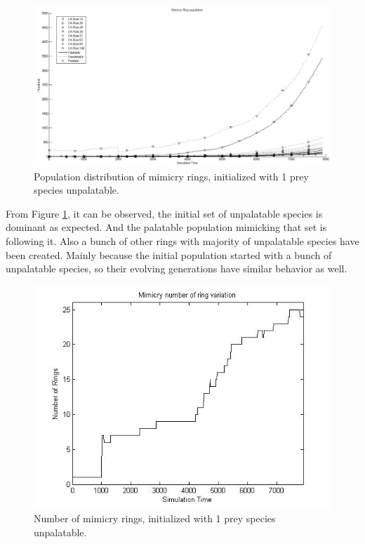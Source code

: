 \begin{figure}[H]
	\centering
	\includegraphics[scale=0.40]{images/simTime8k-1-unp}
	\caption[Population distribution of mimicry rings (1 prey species unpalatable)]{Population distribution of mimicry rings, initialized with 1 prey species unpalatable.}
	\label{fig:plot-1-prey-unp}
\end{figure}

From Figure \ref{fig:plot-1-prey-unp}, it can be observed, the initial set of unpalatable species is dominant as expected. And the palatable population mimicking that set is following it. Also a bunch of other rings with majority of unpalatable species have been created. Mainly because the initial population started with a bunch of unpalatable species, so their evolving generations have similar behavior as well.

\begin{figure}[H]
	\centering
	\includegraphics[scale=0.50]{images/ringSize8k-1Prey-unp}
	\caption[Number of mimicry rings (1 prey species unpalatable)]{Number of mimicry rings, initialized with 1 prey species unpalatable.}
	\label{fig:ringSize8k-1-Prey-unp}
\end{figure}

